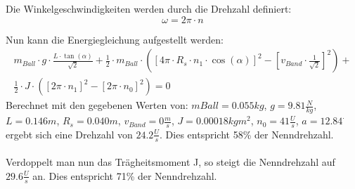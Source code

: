 Die Winkelgeschwindigkeiten werden durch die Drehzahl definiert:
\begin{equation}
    \omega = 2\pi \cdot n
\end{equation}

Nun kann die Energiegleichung aufgestellt werden:
\begin{multline}
    m_{Ball} \cdot g \cdot \frac{L \cdot \tan(\alpha)}{\sqrt{2}} + \frac{1}{2} \cdot m_{Ball} \cdot \left(\left[4\pi \cdot R_s \cdot n_1 \cdot \cos(\alpha)\right]^2 - \left[ v_{Band} \cdot \frac{1}{\sqrt{2}}\right]^2\right) +\\
     \frac{1}{2} \cdot J \cdot \left(\left[2\pi \cdot n_1\right]^2 - \left[2\pi \cdot n_0\right]^2\right) = 0
\end{multline}
Berechnet mit den gegebenen Werten von: $mBall = 0.055 kg$, $g = 9.81\frac{N}{kg}$, $L = 0.146 m$, $R_s = 0.040 m$, $v_{Band} = 0 \frac{m}{s}$, $J = 0.00018 kgm^2$, $n_0 = 41\frac{U}{s}$, $a = 12.84^\cdot$ ergebt sich eine Drehzahl von $24.2 \frac{U}{s}$. Dies entspricht 58\% der Nenndrehzahl.\\
\\
Verdoppelt man nun das Trägheitsmoment J, so steigt die Nenndrehzahl auf $29.6 \frac{U}{s}$ an. Dies entspricht 71\% der Nenndrehzahl.
